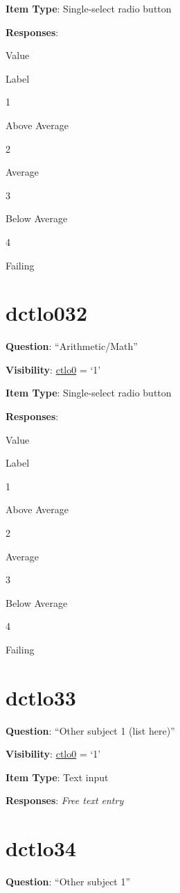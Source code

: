 \documentclass[]{book}
\begin{document}
\textbf{Item Type}: Single-select radio button

\textbf{Responses}:

Value

Label

1

Above Average

2

Average

3

Below Average

4

Failing

\hypertarget{dctlo032}{%
\section{dctlo032}\label{dctlo032}}

\textbf{Question}: ``Arithmetic/Math''

\textbf{Visibility}: \protect\hyperlink{ctlo0}{ctlo0} = `1'

\textbf{Item Type}: Single-select radio button

\textbf{Responses}:

Value

Label

1

Above Average

2

Average

3

Below Average

4

Failing

\hypertarget{dctlo33}{%
\section{dctlo33}\label{dctlo33}}

\textbf{Question}: ``Other subject 1 (list here)''

\textbf{Visibility}: \protect\hyperlink{ctlo0}{ctlo0} = `1'

\textbf{Item Type}: Text input

\textbf{Responses}: \emph{Free text entry}

\hypertarget{dctlo34}{%
\section{dctlo34}\label{dctlo34}}

\textbf{Question}: ``Other subject 1''
\end{document}
